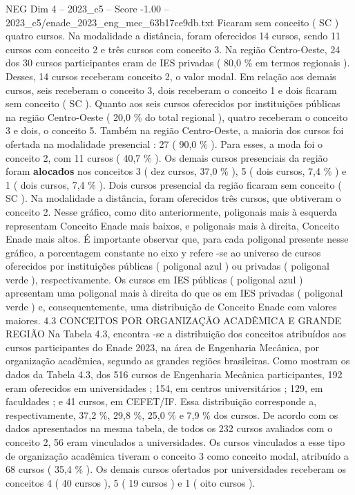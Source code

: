 \begin{textsample}{NEG Dim 4 – 2023\_c5 – Score -1.00 – 2023\_c5/enade\_2023\_eng\_mec\_63b17ce9db.txt}
Ficaram sem conceito ( SC ) quatro cursos.
Na modalidade a distância, foram oferecidos 14 cursos, sendo 11 cursos com conceito 2 e três cursos com conceito 3.
Na região Centro-Oeste, 24 dos 30 cursos participantes eram de IES privadas ( 80,0 \% em termos regionais ).
Desses, 14 cursos receberam conceito 2, o valor modal.
Em relação aos demais cursos, seis receberam o conceito 3, dois receberam o conceito 1 e dois ficaram sem conceito ( SC ).
Quanto aos seis cursos oferecidos por instituições públicas na região Centro-Oeste ( 20,0 \% do total regional ), quatro receberam o conceito 3 e dois, o conceito 5.
Também na região Centro-Oeste, a maioria dos cursos foi ofertada na modalidade presencial : 27 ( 90,0 \% ).
Para esses, a moda foi o conceito 2, com 11 cursos ( 40,7 \% ).
Os demais cursos presenciais da região foram \textbf{alocados} nos conceitos 3 ( dez cursos, 37,0 \% ), 5 ( dois cursos, 7,4 \% ) e 1 ( dois cursos, 7,4 \% ).
Dois cursos presencial da região ficaram sem conceito ( SC ).
Na modalidade a distância, foram oferecidos três cursos, que obtiveram o conceito 2.
Nesse gráfico, como dito anteriormente, poligonais mais à esquerda representam Conceito Enade mais baixos, e poligonais mais à direita, Conceito Enade mais altos.
É importante observar que, para cada poligonal presente nesse gráfico, a porcentagem constante no eixo y refere -se ao universo de cursos oferecidos por instituições públicas ( poligonal azul ) ou privadas ( poligonal verde ), respectivamente.
Os cursos em IES públicas ( poligonal azul ) apresentam uma poligonal mais à direita do que os em IES privadas ( poligonal verde ) e, consequentemente, uma distribuição de Conceito Enade com valores maiores. 4.3 CONCEITOS POR ORGANIZAÇÃO ACADÊMICA E GRANDE REGIÃO Na Tabela 4.3, encontra -se a distribuição dos conceitos atribuídos aos cursos participantes do Enade 2023, na área de Engenharia Mecânica, por organização acadêmica, segundo as grandes regiões brasileiras.
Como mostram os dados da Tabela 4.3, dos 516 cursos de Engenharia Mecânica participantes, 192 eram oferecidos em universidades ; 154, em centros universitários ; 129, em faculdades ; e 41 cursos, em CEFET/IF.
Essa distribuição corresponde a, respectivamente, 37,2 \%, 29,8 \%, 25,0 \% e 7,9 \% dos cursos.
De acordo com os dados apresentados na mesma tabela, de todos os 232 cursos avaliados com o conceito 2, 56 eram vinculados a universidades.
Os cursos vinculados a esse tipo de organização acadêmica tiveram o conceito 3 como conceito modal, atribuído a 68 cursos ( 35,4 \% ).
Os demais cursos ofertados por universidades receberam os conceitos 4 ( 40 cursos ), 5 ( 19 cursos ) e 1 ( oito cursos ).

\end{textsample}
